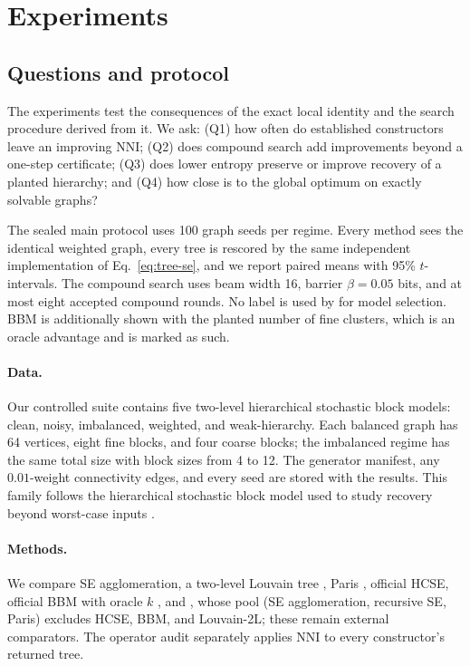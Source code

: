 \section{Experiments}\label{sec:experiments}
\subsection{Questions and protocol}
The experiments test the consequences of the exact local identity and the
search procedure derived from it. We ask: (Q1) how often do established
constructors leave an improving NNI;
(Q2) does compound search add improvements beyond a one-step certificate;
(Q3) does lower entropy preserve or improve recovery of a planted hierarchy;
and (Q4) how close is \NEST to the global optimum on exactly solvable graphs?

The sealed main protocol uses 100 graph seeds per regime. Every method sees the
identical weighted graph, every tree is rescored by the same independent
implementation of Eq.~\eqref{eq:tree-se}, and we report paired means with 95\%
$t$-intervals. The compound search uses beam width 16, barrier $\beta=0.05$ bits, and at
most eight accepted compound rounds. No label is used by \NEST for model
selection. BBM is additionally shown with the planted number of fine clusters,
which is an oracle advantage and is marked as such.

\paragraph{Data.}
Our controlled suite contains five two-level hierarchical stochastic block
models: clean, noisy, imbalanced, weighted, and weak-hierarchy. Each balanced
graph has 64 vertices, eight fine blocks, and four coarse blocks; the
imbalanced regime has the same total size with block sizes from 4 to 12. The
generator manifest, any $0.01$-weight connectivity edges, and every seed are
stored with the results. This family follows the hierarchical stochastic block
model used to study recovery beyond worst-case inputs \cite{cohenaddad2017hsbm}.

\paragraph{Methods.}
We compare SE agglomeration, a two-level Louvain tree \cite{blondel2008}, Paris
\cite{bonald2018paris}, official HCSE, official BBM with oracle $k$
\cite{pan2025}, and \NEST, whose pool (SE agglomeration, recursive SE, Paris)
excludes HCSE, BBM, and Louvain-2L; these remain external comparators. The
operator audit separately applies NNI to every constructor's returned tree.

